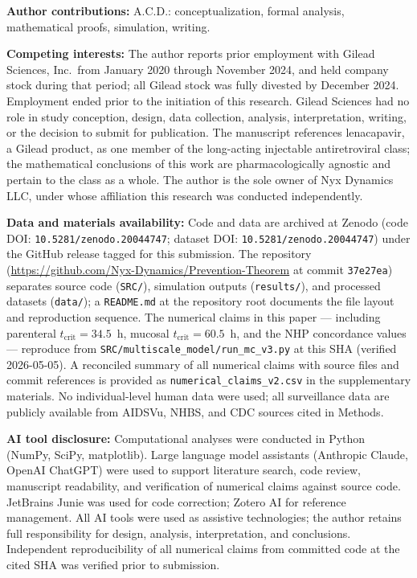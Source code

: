 \documentclass[10pt,letterpaper]{article}
\theoremstyle{definition}
\theoremstyle{remark}
\newcommand{\tcrit}{t_{\text{crit}}}
\begin{document}
\textbf{Author contributions:} A.C.D.: conceptualization, formal analysis, mathematical proofs, simulation, writing.

\textbf{Competing interests:} The author reports prior employment with Gilead Sciences, Inc.\ from January 2020 through November 2024, and held company stock during that period; all Gilead stock was fully divested by December 2024. Employment ended prior to the initiation of this research. Gilead Sciences had no role in study conception, design, data collection, analysis, interpretation, writing, or the decision to submit for publication. The manuscript references lenacapavir, a Gilead product, as one member of the long-acting injectable antiretroviral class; the mathematical conclusions of this work are pharmacologically agnostic and pertain to the class as a whole. The author is the sole owner of Nyx Dynamics LLC, under whose affiliation this research was conducted independently.

\textbf{Data and materials availability:} Code and data are archived at Zenodo (code DOI: \texttt{10.5281/zenodo.20044747}; dataset DOI: \texttt{10.5281/zenodo.20044747}) under the GitHub release tagged for this submission. The repository (\url{https://github.com/Nyx-Dynamics/Prevention-Theorem} at commit \texttt{37e27ea}) separates source code (\texttt{SRC/}), simulation outputs (\texttt{results/}), and processed datasets (\texttt{data/}); a \texttt{README.md} at the repository root documents the file layout and reproduction sequence. The numerical claims in this paper --- including parenteral $\tcrit = 34.5$~h, mucosal $\tcrit = 60.5$~h, and the NHP concordance values --- reproduce from \texttt{SRC/multiscale\_model/run\_mc\_v3.py} at this SHA (verified 2026-05-05). A reconciled summary of all numerical claims with source files and commit references is provided as \texttt{numerical\_claims\_v2.csv} in the supplementary materials. No individual-level human data were used; all surveillance data are publicly available from AIDSVu, NHBS, and CDC sources cited in Methods.

\textbf{AI tool disclosure:} Computational analyses were conducted in Python (NumPy, SciPy, matplotlib). Large language model assistants (Anthropic Claude, OpenAI ChatGPT) were used to support literature search, code review, manuscript readability, and verification of numerical claims against source code. JetBrains Junie was used for code correction; Zotero AI for reference management. All AI tools were used as assistive technologies; the author retains full responsibility for design, analysis, interpretation, and conclusions. Independent reproducibility of all numerical claims from committed code at the cited SHA was verified prior to submission.
\end{document}
